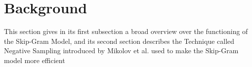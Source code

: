 
\section{Background}\label{sec:background}

This section gives in its first subsection a broad overview over the functioning of the Skip-Gram Model, and its second section describes the Technique called Negative Sampling introduced by Mikolov et al. \cite{mikolov2} used to make the Skip-Gram model more efficient
